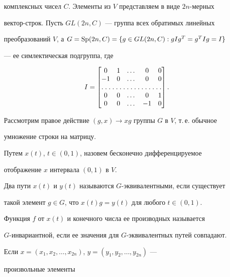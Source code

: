 комплексных чисел $C$. Элементы из $V$ представляем в виде $2n$-мерных 


вектор-строк. Пусть $GL(2n,C)$ --- группа всех обратимых линейных 


преобразований $V$, а $G=\operatorname{Sp}(2n,C)=\{g\in GL(2n,C):g I g^T=g^T I g=I\}$ 


--- ее симлектическая подгруппа, где


$$


I=


\begin{bmatrix}


0 & 1 & \dotsc & 0 & 0 \\


-1 & 0 & \dotsc & 0 & 0 \\


\hdotsfor[1.5]{5} \\


0 & 0 & \dotsc & 0 & 1 \\


0 & 0 & \dotsc & -1 & 0


\end{bmatrix}


.


$$


Рассмотрим правое действие $(g,x)\to x g$ группы $G$ в $V$, т.\,е. обычное 


умножение строки на матрицу.





Путем $x(t)$, $t\in(0,1)$, назовем бесконечно дифференцируемое 


отображение $x$ интервала $(0,1)$ в $V$.





Два пути $x(t)$ и $y(t)$  называются $G$-эквивалентными, если существует 


такой элемент $g\in G$, что $x(t)g=y(t)$ для любого $t\in(0,1)$.





Функция $f$ от $x(t)$ и конечного числа ее производных называется


$G$-инвариантной, если ее значения для $G$-эквивалентных путей совпадают.





Если $x=(x_1,x_2,\dotsc,x_{2n})$, $y=(y_1,y_2,\dotsc,y_{2n})$ --- 


произвольные элементы 


